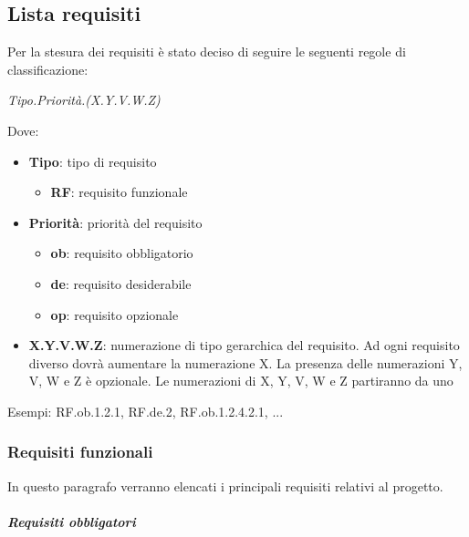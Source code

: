 \subsection{Lista requisiti}
Per la stesura dei requisiti \`{e} stato deciso di seguire le seguenti regole di classificazione:

\begin{doublespace}
\begin{center}
\emph{Tipo.Priorit\`{a}.(X.Y.V.W.Z)}
\par\end{center}
\end{doublespace}

Dove:
\begin{itemize}
\item \textbf{Tipo}: tipo di requisito

\begin{itemize}
\item \textbf{RF}: requisito funzionale
\end{itemize}

\item \textbf{Priorit\`{a}}: priorit\`{a} del requisito

\begin{itemize}
\item \textbf{ob}: requisito obbligatorio
\item \textbf{de}: requisito desiderabile
\item \textbf{op}: requisito opzionale
\end{itemize}
\item \textbf{X.Y.V.W.Z}: numerazione di tipo gerarchica del requisito. Ad ogni requisito diverso dovr\`{a} aumentare la numerazione X. La presenza delle
numerazioni Y, V, W e Z \`{e} opzionale. Le numerazioni di X, Y, V, W e Z partiranno da uno
\end{itemize}
Esempi: RF.ob.1.2.1, RF.de.2, RF.ob.1.2.4.2.1, ...

\subsubsection{Requisiti funzionali}
In questo paragrafo verranno elencati i principali requisiti relativi al progetto.

\subparagraph{Requisiti obbligatori} \quad \quad 

